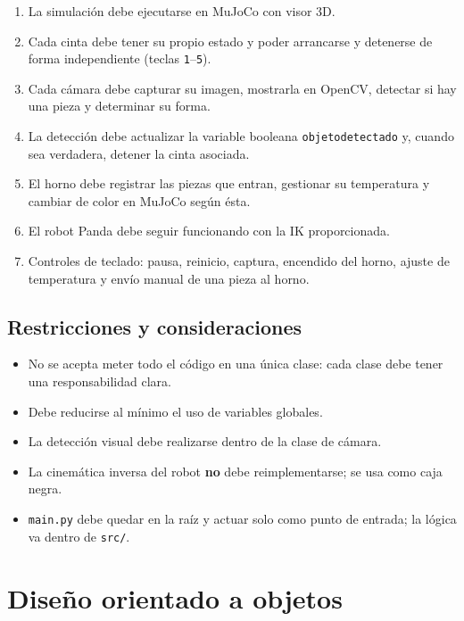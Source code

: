 \documentclass[12pt,a4paper]{article}
\renewcommand{\_}{\guionbajo\allowbreak}
\begin{document}
\begin{enumerate}
    \item La simulación debe ejecutarse en MuJoCo con visor 3D.
    \item Cada cinta debe tener su propio estado y poder arrancarse y detenerse de forma
          independiente (teclas \texttt{1}--\texttt{5}).
    \item Cada cámara debe capturar su imagen, mostrarla en OpenCV, detectar si hay una
          pieza y determinar su forma.
    \item La detección debe actualizar la variable booleana \texttt{objeto\_detectado} y,
          cuando sea verdadera, detener la cinta asociada.
    \item El horno debe registrar las piezas que entran, gestionar su temperatura y
          cambiar de color en MuJoCo según ésta.
    \item El robot Panda debe seguir funcionando con la IK proporcionada.
    \item Controles de teclado: pausa, reinicio, captura, encendido del horno, ajuste de
          temperatura y envío manual de una pieza al horno.
\end{enumerate}
\clearpage
\subsection{Restricciones y consideraciones}

\begin{itemize}
    \item No se acepta meter todo el código en una única clase: cada clase debe tener una
          responsabilidad clara.
    \item Debe reducirse al mínimo el uso de variables globales.
    \item La detección visual debe realizarse dentro de la clase de cámara.
    \item La cinemática inversa del robot \textbf{no} debe reimplementarse; se usa como
          caja negra.
    \item \texttt{main.py} debe quedar en la raíz y actuar solo como punto de entrada; la
          lógica va dentro de \texttt{src/}.
\end{itemize}

\clearpage
\section{Diseño orientado a objetos}
\end{document}
